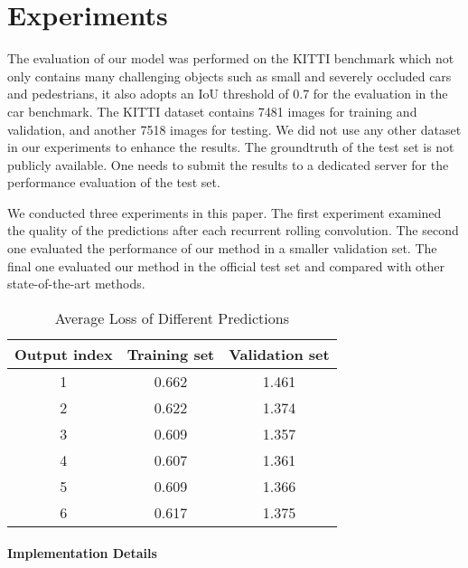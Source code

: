\documentclass[10pt,twocolumn,letterpaper]{article}
\begin{document}
\section{Experiments}
The evaluation of our model was performed on the KITTI benchmark \cite{Geiger2012CVPR} which not only contains many challenging objects such as small and severely occluded cars and pedestrians, it also adopts an IoU threshold of 0.7 for the evaluation in the car benchmark. The KITTI dataset contains 7481 images for training and validation, and another 7518 images for testing. We did not use any other dataset in our experiments to enhance the results. The groundtruth of the test set is not publicly available. One needs to submit the results to a dedicated server for the performance evaluation of the test set.

We conducted three experiments in this paper. The first experiment examined the quality of the predictions after each recurrent rolling convolution. The second one evaluated the performance of our method in a smaller validation set. The final one evaluated our method in the official test set and compared with other state-of-the-art methods.

\begin{table}[!hbp] 
\centering
\caption{Average Loss of Different Predictions}
\label{table:rrc_outputs}
\begin{tabular}{|c||c|c|}
\hline
\hline
Output index & Training set & Validation set  \\
\hline
1& 0.662 & 1.461\\
2& 0.622 & 1.374\\
3& 0.609& 1.357\\
4& 0.607& 1.361\\
5& 0.609& 1.366\\
6& 0.617& 1.375\\
\hline
\end{tabular}
\end{table}

\paragraph{Implementation Details}
\end{document}
